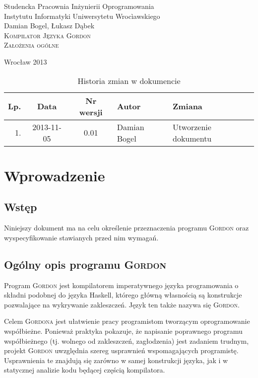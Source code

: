 \documentclass{documentation}
\begin{document}
\begin{titlepage}
\begin{center}
Studencka Pracownia Inżynierii Oprogramowania\\
Instytutu Informatyki Uniwersytetu Wrocìawskiego\\[6cm]

Damian Bogel, Łukasz Dąbek\\[1cm]
\textsc{\LARGE Kompilator Języka Gordon}\\[0.5cm]
\textsc{\large Założenia ogólne}

\vfill
Wrocław 2013 \\[2.5cm]

\end{center}
\end{titlepage}

\newpage
\begin{table}
	\centering
	\caption{Historia zmian w dokumencie}
		\begin{tabular}{|r|c|c|l|l|}
		\hline
		Lp.  & Data       & Nr wersji & Autor                 & Zmiana \\ \hline
		1.   & 2013-11-05 & 0.01 & Damian Bogel & Utworzenie dokumentu \\ \hline
	\end{tabular}
\end{table}
\newpage

\tableofcontents
\setcounter{page}{2}

\newpage

\section{Wprowadzenie}
\subsection{Wstęp}
\noindent Niniejszy dokument ma na celu określenie przeznaczenia programu \textsc{Gordon} oraz wyspecyfikowanie stawianych przed nim wymagań.

\subsection{Ogólny opis programu \textsc{Gordon}}
\noindent Program \textsc{Gordon} jest kompilatorem imperatywnego języka programowania o składni podobnej do języka Haskell, którego główną własnością są konstrukcje pozwalające na wykrywanie zakleszczeń. Język ten także nazywa się \textsc{Gordon}.

Celem \textsc{Gordona} jest ułatwienie pracy programistom tworzącym oprogramowanie współbieżne. Ponieważ praktyka pokazuje, że napisanie poprawnego programu współbieżnego (tj. wolnego od zakleszczeń, zagłodzenia) jest zadaniem trudnym, projekt \textsc{Gordon} uwzględnia szereg usprawnień wspomagających programistę. Usprawnienia te znajdują się zarówno w samej konstrukcji języka, jak i w statycznej analizie kodu będącej częścią kompilatora.
\end{document}
